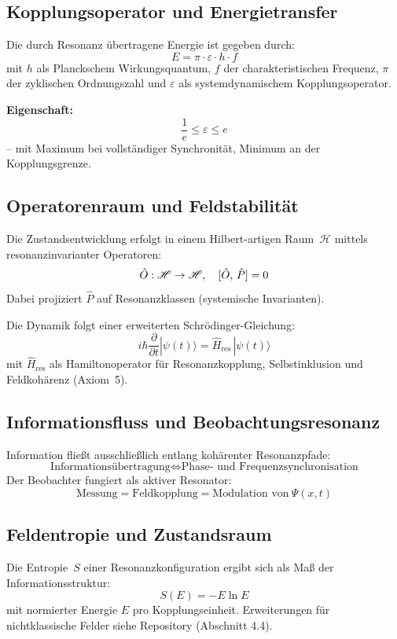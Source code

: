 \documentclass[12pt]{iopart}
\providecommand{\mathcal}[1]{\mathscr{#1}}
\providecommand{\text}[1]{\mbox{#1}}
\providecommand{\quad}{\hskip1em\relax}
\begin{document}
\subsection{Kopplungsoperator und Energietransfer}

Die durch Resonanz übertragene Energie ist gegeben durch:
\[
E = \pi \cdot \varepsilon \cdot h \cdot f
\]
mit $h$ als Planckschem Wirkungsquantum, $f$ der charakteristischen Frequenz, $\pi$ der zyklischen Ordnungszahl und $\varepsilon$ als systemdynamischem Kopplungsoperator.

\textbf{Eigenschaft:}
\[
\frac{1}{e} \leq \varepsilon \leq e
\]
– mit Maximum bei vollständiger Synchronität, Minimum an der Kopplungsgrenze.

\subsection{Operatorenraum und Feldstabilität}

Die Zustandsentwicklung erfolgt in einem Hilbert-artigen Raum~$\mathcal{H}$ mittels resonanzinvarianter Operatoren:
\[
\hat{O} : \mathcal{H} \to \mathcal{H},\quad [\hat{O},\,\hat{P}] = 0
\]
Dabei projiziert $\hat{P}$ auf Resonanzklassen (systemische Invarianten).

Die Dynamik folgt einer erweiterten Schrödinger-Gleichung:
\[
i\hbar \frac{\partial}{\partial t} |\psi(t)\rangle = \hat{H}_{\text{res}}\, |\psi(t)\rangle
\]
mit $\hat{H}_{\text{res}}$ als Hamiltonoperator für Resonanzkopplung, Selbstinklusion und Feldkohärenz (Axiom~5).

\subsection{Informationsfluss und Beobachtungsresonanz}

Information fließt ausschließlich entlang kohärenter Resonanzpfade:
\[
\text{Informationsübertragung} \iff \text{Phase- und Frequenzsynchronisation}
\]
Der Beobachter fungiert als aktiver Resonator:
\[
\text{Messung} = \text{Feldkopplung} = \text{Modulation von}~\Psi(x, t)
\]

\subsection{Feldentropie und Zustandsraum}

Die Entropie~$S$ einer Resonanzkonfiguration ergibt sich als Maß der Informationsstruktur:
\[
S(E) = -E \ln E
\]
mit normierter Energie $E$ pro Kopplungseinheit. Erweiterungen für nichtklassische Felder siehe Repository (Abschnitt 4.4).
\end{document}
